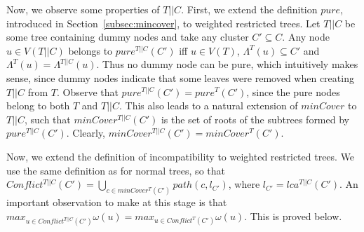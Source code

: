 \documentclass[final,1p,times]{elsarticle}
\newcommand{\leafset}{\Lambda}
\newcommand{\weight}{\omega}
\begin{document}
    Now, we observe some properties of $T||C$. First, we extend the definition $pure$, introduced in Section~\ref{subsec:mincover}, to weighted restricted trees. Let $T||C$ be some tree containing dummy nodes and take any cluster $C' \subseteq C$. Any node $u \in V(T||C)$ belongs to $pure^{T||C}(C')$ iff $u \in V(T)$, $\leafset^{T}(u) \subseteq C'$ and $\leafset^{T}(u) = \leafset^{T||C}(u)$. Thus no dummy node can be pure, which intuitively makes sense, since dummy nodes indicate that some leaves were removed when creating $T||C$ from $T$. Observe that $pure^{T||C}(C') = pure^{T}(C')$, since the pure nodes belong to both $T$ and $T||C$. This also leads to a natural extension of $minCover$ to $T||C$, such that $minCover^{T||C}(C')$ is the set of roots of the subtrees formed by $pure^{T||C}(C')$. Clearly, $minCover^{T||C}(C') = minCover^{T}(C')$.

    Now, we extend the definition of incompatibility to weighted restricted trees. We use the same definition as for normal trees, so that $Conflict^{T||C}(C') = \bigcup_{c \in minCover^{T}(C')} path(c, l_{C'})$, where $l_{C'} = lca^{T||C}(C')$. An important observation to make at this stage is that $max_{u \in Conflict^{T||C}(C')} \weight(u) = max_{u \in Conflict^{T}(C')} \weight(u)$. This is proved below.
\end{document}
